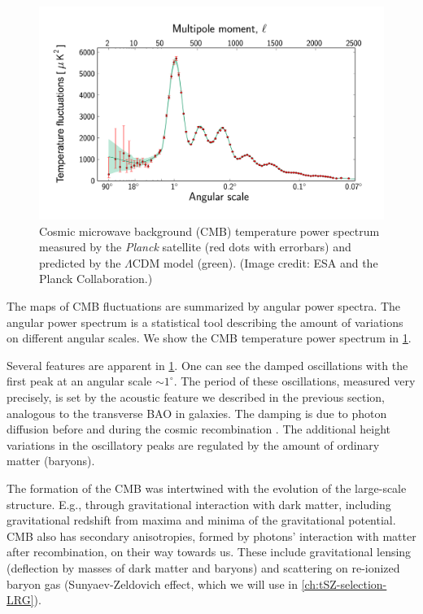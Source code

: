 \begin{figure}[hbt]
    \centering
    \includegraphics[width=\textwidth]{img/Planck_Power_Spectrum.jpg}
    \caption{Cosmic microwave background (CMB) temperature power spectrum measured by the {\it Planck} satellite (red dots with errorbars) and predicted by the $\Lambda$CDM model (green). (Image credit: ESA and the Planck Collaboration.)}
    \label{fig:cmb-power-spectrum}
\end{figure}

The maps of CMB fluctuations are summarized by angular power spectra.
The angular power spectrum is a statistical tool describing the amount of variations on different angular scales.
We show the CMB temperature power spectrum in \cref{fig:cmb-power-spectrum}.

Several features are apparent in \cref{fig:cmb-power-spectrum}.
One can see the damped oscillations with the first peak at an angular scale $\sim 1^\circ$.
The period of these oscillations, measured very precisely, is set by the acoustic feature we described in the previous section, analogous to the transverse BAO in galaxies.
The damping is due to photon diffusion before and during the cosmic recombination \citep[the process known as Silk damping,][]{silk-damping}.
The additional height variations in the oscillatory peaks are regulated by the amount of ordinary matter (baryons).

The formation of the CMB was intertwined with the evolution of the large-scale structure.
E.g., through gravitational interaction with dark matter, including gravitational redshift from maxima and minima of the gravitational potential.
CMB also has secondary anisotropies, formed by photons' interaction with matter after recombination, on their way towards us.
These include gravitational lensing (deflection by masses of dark matter and baryons) and scattering on re-ionized baryon gas (Sunyaev-Zeldovich effect, which we will use in \cref{ch:tSZ-selection-LRG}).

